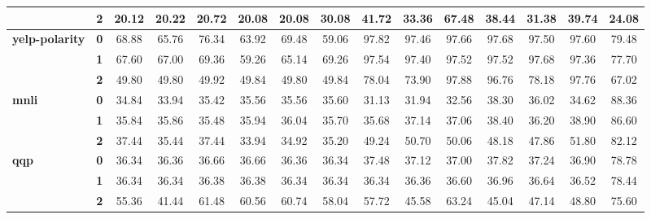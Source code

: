 \begin{table*}[ht]
\begin{tabular}{llccccccccccccc}
		& \textbf{2} & 20.12      & 20.22      & 20.72      & 20.08      & 20.08      & 30.08      & 41.72       & 33.36       & 67.48      & 38.44        & 31.38        & 39.74        & 24.08      \\
		\hline
		\multirow{3}{*}{\textbf{yelp-polarity}} & \textbf{0} & 68.88      & 65.76      & 76.34      & 63.92      & 69.48      & 59.06      & 97.82       & 97.46       & 97.66      & 97.68        & 97.50        & 97.60        & 79.48      \\
		& \textbf{1} & 67.60      & 67.00      & 69.36      & 59.26      & 65.14      & 69.26      & 97.54       & 97.40       & 97.52      & 97.52        & 97.68        & 97.36        & 77.70      \\
		& \textbf{2} & 49.80      & 49.80      & 49.92      & 49.84      & 49.80      & 49.84      & 78.04       & 73.90       & 97.88      & 96.76        & 78.18        & 97.76        & 67.02      \\
		\hline
		\multirow{3}{*}{\textbf{mnli}}          & \textbf{0} & 34.84      & 33.94      & 35.42      & 35.56      & 35.56      & 35.60      & 31.13       & 31.94       & 32.56      & 38.30        & 36.02        & 34.62        & 88.36      \\
		& \textbf{1} & 35.84      & 35.86      & 35.48      & 35.94      & 36.04      & 35.70      & 35.68       & 37.14       & 37.06      & 38.40        & 36.20        & 38.90        & 86.60      \\
		& \textbf{2} & 37.44      & 35.44      & 37.44      & 33.94      & 34.92      & 35.20      & 49.24       & 50.70       & 50.06      & 48.18        & 47.86        & 51.80        & 82.12      \\
		\hline
		\multirow{3}{*}{\textbf{qqp}}           & \textbf{0} & 36.34      & 36.36      & 36.66      & 36.66      & 36.36      & 36.34      & 37.48       & 37.12       & 37.00      & 37.82        & 37.24        & 36.90        & 78.78      \\
		& \textbf{1} & 36.34      & 36.34      & 36.38      & 36.38      & 36.34      & 36.34      & 36.34       & 36.36       & 36.60      & 36.96        & 36.64        & 36.52        & 78.44      \\
		& \textbf{2} & 55.36      & 41.44      & 61.48      & 60.56      & 60.74      & 58.04      & 57.72       & 45.58       & 63.24      & 45.04        & 47.14        & 48.80        & 75.60      \\
		\bottomrule
	\end{tabular}
	

\end{table*}
